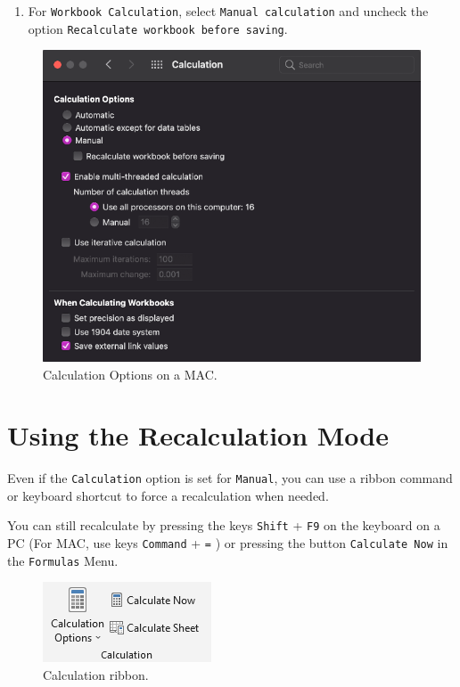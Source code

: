 \documentclass[
]{book}
\providecommand{\tightlist}{%
  \setlength{\itemsep}{0pt}\setlength{\parskip}{0pt}}
\begin{document}
\begin{enumerate}
\def\labelenumi{\arabic{enumi}.}
\setcounter{enumi}{2}
\tightlist
\item
  For \texttt{Workbook\ Calculation}, select \texttt{Manual\ calculation} and uncheck the option \texttt{Recalculate\ workbook\ before\ saving}.
\end{enumerate}

\begin{figure}

{\centering \includegraphics[width=0.6\linewidth]{manual-calculation3} 

}

\caption{Calculation Options on a MAC.}\label{fig:manual-calculation3}
\end{figure}

\hypertarget{using-the-recalculation-mode}{%
\section{Using the Recalculation Mode}\label{using-the-recalculation-mode}}

Even if the \texttt{Calculation} option is set for \texttt{Manual}, you can use a ribbon command or keyboard shortcut to force a recalculation when needed.

You can still recalculate by pressing the keys \texttt{Shift} + \texttt{F9} on the keyboard on a PC (For MAC, use keys \texttt{Command} + \texttt{=} ) or pressing the button \texttt{Calculate\ Now} in the \texttt{Formulas} Menu.

\begin{figure}

{\centering \includegraphics[width=0.3\linewidth]{recalc-pc} 

}

\caption{Calculation ribbon.}\label{fig:calculation-ribbons}
\end{figure}
\end{document}
